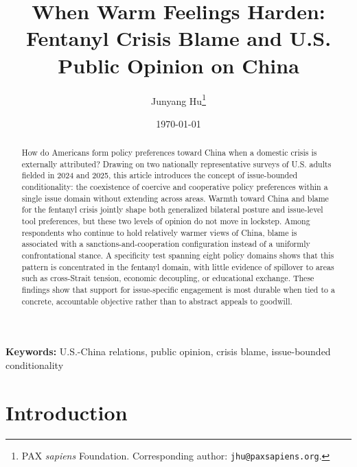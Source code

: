 \documentclass[12pt,letterpaper]{article}
\title{When Warm Feelings Harden: Fentanyl Crisis Blame and U.S. Public Opinion on China}
\author{
  Junyang Hu\thanks{PAX \textit{sapiens} Foundation. Corresponding author: \texttt{jhu@paxsapiens.org}.}
}
\date{\today}
\begin{document}
\maketitle
\thispagestyle{empty}

\begin{abstract}
\noindent \singlespacing

How do Americans form policy preferences toward China when a domestic crisis is externally attributed? Drawing on two nationally representative surveys of U.S. adults fielded in 2024 and 2025, this article introduces the concept of issue-bounded conditionality: the coexistence of coercive and cooperative policy preferences within a single issue domain without extending across areas. Warmth toward China and blame for the fentanyl crisis jointly shape both generalized bilateral posture and issue-level tool preferences, but these two levels of opinion do not move in lockstep. Among respondents who continue to hold relatively warmer views of China, blame is associated with a sanctions-and-cooperation configuration instead of a uniformly confrontational stance. A specificity test spanning eight policy domains shows that this pattern is concentrated in the fentanyl domain, with little evidence of spillover to areas such as cross-Strait tension, economic decoupling, or educational exchange. These findings show that support for issue-specific engagement is most durable when tied to a concrete, accountable objective rather than to abstract appeals to goodwill.

\end{abstract}

\noindent \textbf{Keywords:} U.S.-China relations, public opinion, crisis blame, issue-bounded conditionality

\newpage
\setcounter{page}{1}

\section{Introduction}
\label{sec:introduction}
\end{document}
